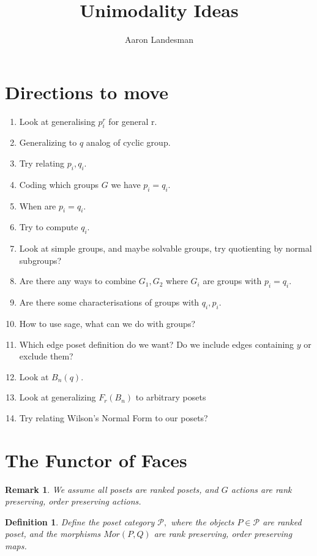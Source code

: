 \documentclass{amsart}
\title{Unimodality Ideas}
\author{Aaron Landesman}
\newtheorem{defn}[subsubsection]{Definition}
\newtheorem{rem}[subsubsection]{Remark}
\begin{document}
\maketitle
\section{Directions to move}
\begin{enumerate}
	\item Look at generalising $p_i^r$ for general r.
	\item Generalizing to $q$ analog of cyclic group.
	\item Try relating $p_i,q_i.$
	\item Coding which groups $G$ we have $p_i=q_i.$
	\item When are $p_i = q_i.$
	\item Try to compute $q_i.$
	\item Look at simple groups, and maybe solvable groups, try quotienting by normal subgroups?
	\item Are there any ways to combine $G_1,G_2$ where $G_i$ are groups with $p_i = q_i.$
	\item Are there some characterisations of groups with $q_i,p_i.$
	\item How to use sage, what can we do with groups?
	\item Which edge poset definition do we want? Do we include edges containing $y$ or exclude them?
	\item Look at $B_n(q).$ 
	\item Look at generalizing $F_r(B_n)$ to arbitrary posets
	\item Try relating Wilson's Normal Form to our posets?
\end{enumerate}

\section{The Functor of Faces}
\begin{rem}
We assume all posets are ranked posets, and $G$ actions are rank preserving, order preserving actions.
\end{rem}

\begin{defn}
Define the {\it poset category} $\mathcal P,$ where the objects $P \in \mathcal P$ are ranked poset, and the morphisms $Mor(P,Q)$ are rank preserving, order preserving maps.
\end{defn}
\end{document}
